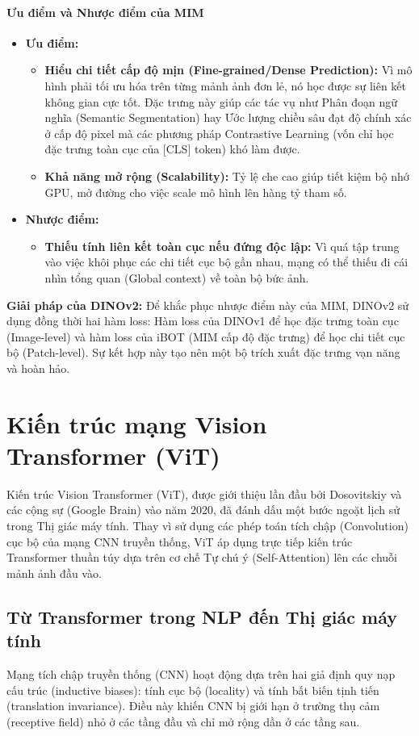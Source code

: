 \paragraph{Ưu điểm và Nhược điểm của MIM}
\begin{itemize}
    \item \textbf{Ưu điểm:}
    \begin{itemize}
        \item \textbf{Hiểu chi tiết cấp độ mịn (Fine-grained/Dense Prediction):} Vì mô hình phải tối ưu hóa trên từng mảnh ảnh đơn lẻ, nó học được sự liên kết không gian cực tốt. Đặc trưng này giúp các tác vụ như Phân đoạn ngữ nghĩa (Semantic Segmentation) hay Ước lượng chiều sâu đạt độ chính xác ở cấp độ pixel mà các phương pháp Contrastive Learning (vốn chỉ học đặc trưng toàn cục của [CLS] token) khó làm được.
        \item \textbf{Khả năng mở rộng (Scalability):} Tỷ lệ che cao giúp tiết kiệm bộ nhớ GPU, mở đường cho việc scale mô hình lên hàng tỷ tham số.
    \end{itemize}
    \item \textbf{Nhược điểm:}
    \begin{itemize}
        \item \textbf{Thiếu tính liên kết toàn cục nếu đứng độc lập:} Vì quá tập trung vào việc khôi phục các chi tiết cục bộ gần nhau, mạng có thể thiếu đi cái nhìn tổng quan (Global context) về toàn bộ bức ảnh.
    \end{itemize}
\end{itemize}
\textbf{Giải pháp của DINOv2:} Để khắc phục nhược điểm này của MIM, DINOv2 sử dụng đồng thời hai hàm loss: Hàm loss của DINOv1 để học đặc trưng toàn cục (Image-level) và hàm loss của iBOT (MIM cấp độ đặc trưng) để học chi tiết cục bộ (Patch-level). Sự kết hợp này tạo nên một bộ trích xuất đặc trưng vạn năng và hoàn hảo.

\section{Kiến trúc mạng Vision Transformer (ViT)}
Kiến trúc Vision Transformer (ViT), được giới thiệu lần đầu bởi Dosovitskiy và các cộng sự (Google Brain) vào năm 2020, đã đánh dấu một bước ngoặt lịch sử trong Thị giác máy tính. Thay vì sử dụng các phép toán tích chập (Convolution) cục bộ của mạng CNN truyền thống, ViT áp dụng trực tiếp kiến trúc Transformer thuần túy dựa trên cơ chế Tự chú ý (Self-Attention) lên các chuỗi mảnh ảnh đầu vào.

\subsection{Từ Transformer trong NLP đến Thị giác máy tính}
Mạng tích chập truyền thống (CNN) hoạt động dựa trên hai giả định quy nạp cấu trúc (inductive biases): tính cục bộ (locality) và tính bất biến tịnh tiến (translation invariance). Điều này khiến CNN bị giới hạn ở trường thụ cảm (receptive field) nhỏ ở các tầng đầu và chỉ mở rộng dần ở các tầng sau.

